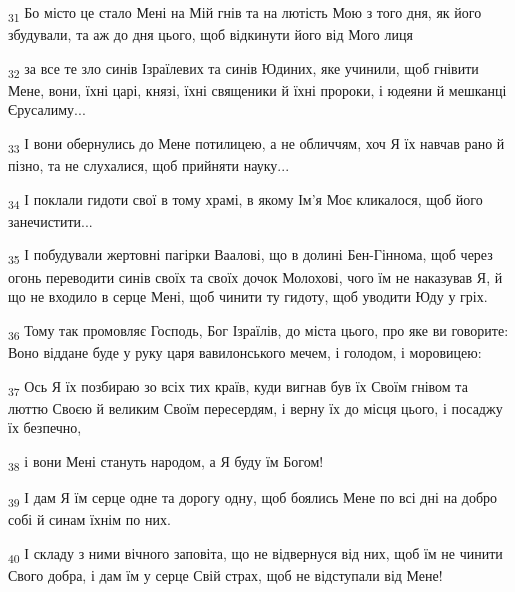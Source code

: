 \begin{tcolorbox}
\textsubscript{31} Бо місто це стало Мені на Мій гнів та на лютість Мою з того дня, як його збудували, та аж до дня цього, щоб відкинути його від Мого лиця
\end{tcolorbox}
\begin{tcolorbox}
\textsubscript{32} за все те зло синів Ізраїлевих та синів Юдиних, яке учинили, щоб гнівити Мене, вони, їхні царі, князі, їхні священики й їхні пророки, і юдеяни й мешканці Єрусалиму...
\end{tcolorbox}
\begin{tcolorbox}
\textsubscript{33} І вони обернулись до Мене потилицею, а не обличчям, хоч Я їх навчав рано й пізно, та не слухалися, щоб прийняти науку...
\end{tcolorbox}
\begin{tcolorbox}
\textsubscript{34} І поклали гидоти свої в тому храмі, в якому Ім'я Моє кликалося, щоб його занечистити...
\end{tcolorbox}
\begin{tcolorbox}
\textsubscript{35} І побудували жертовні пагірки Ваалові, що в долині Бен-Гіннома, щоб через огонь переводити синів своїх та своїх дочок Молохові, чого їм не наказував Я, й що не входило в серце Мені, щоб чинити ту гидоту, щоб уводити Юду у гріх.
\end{tcolorbox}
\begin{tcolorbox}
\textsubscript{36} Тому так промовляє Господь, Бог Ізраїлів, до міста цього, про яке ви говорите: Воно віддане буде у руку царя вавилонського мечем, і голодом, і моровицею:
\end{tcolorbox}
\begin{tcolorbox}
\textsubscript{37} Ось Я їх позбираю зо всіх тих країв, куди вигнав був їх Своїм гнівом та люттю Своєю й великим Своїм пересердям, і верну їх до місця цього, і посаджу їх безпечно,
\end{tcolorbox}
\begin{tcolorbox}
\textsubscript{38} і вони Мені стануть народом, а Я буду їм Богом!
\end{tcolorbox}
\begin{tcolorbox}
\textsubscript{39} І дам Я їм серце одне та дорогу одну, щоб боялись Мене по всі дні на добро собі й синам їхнім по них.
\end{tcolorbox}
\begin{tcolorbox}
\textsubscript{40} І складу з ними вічного заповіта, що не відвернуся від них, щоб їм не чинити Свого добра, і дам їм у серце Свій страх, щоб не відступали від Мене!
\end{tcolorbox}
